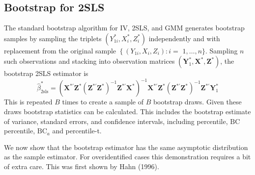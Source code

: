\documentclass[10pt]{article}
\begin{document}
\subsection{Bootstrap for 2SLS}
The standard bootstrap algorithm for IV, 2SLS, and GMM generates bootstrap samples by sampling the triplets $\left(Y_{1 i}^{*}, X_{i}^{*}, Z_{i}^{*}\right)$ independently and with replacement from the original sample $\left\{\left(Y_{1 i}, X_{i}, Z_{i}\right): i=\right.$ $1, \ldots, n\}$. Sampling $n$ such observations and stacking into observation matrices $\left(\boldsymbol{Y}_{1}^{*}, \boldsymbol{X}^{*}, \boldsymbol{Z}^{*}\right)$, the bootstrap 2SLS estimator is
$$
\widehat{\beta}_{2 \mathrm{sls}}^{*}=\left(\boldsymbol{X}^{* \prime} \boldsymbol{Z}^{*}\left(\boldsymbol{Z}^{* \prime} \boldsymbol{Z}^{*}\right)^{-1} \boldsymbol{Z}^{* \prime} \boldsymbol{X}^{*}\right)^{-1} \boldsymbol{X}^{* \prime} \boldsymbol{Z}^{*}\left(\boldsymbol{Z}^{* \prime} \boldsymbol{Z}^{*}\right)^{-1} \boldsymbol{Z}^{* \prime} \boldsymbol{Y}_{1}^{*}
$$
This is repeated $B$ times to create a sample of $B$ bootstrap draws. Given these draws bootstrap statistics can be calculated. This includes the bootstrap estimate of variance, standard errors, and confidence intervals, including percentile, $\mathrm{BC}$ percentile, $\mathrm{BC}_{a}$ and percentile-t.

We now show that the bootstrap estimator has the same asymptotic distribution as the sample estimator. For overidentified cases this demonstration requires a bit of extra care. This was first shown by Hahn (1996).
\end{document}
